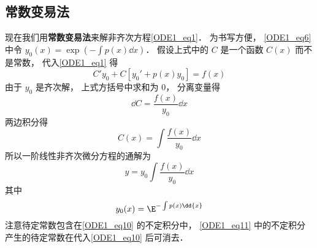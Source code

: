 \subsection{常数变易法}

现在我们用\textbf{常数变易法}来解非齐次方程\autoref{ODE1_eq1}． 为书写方便， \autoref{ODE1_eq6} 中令 $y_0(x) = \exp(-\int p(x) \dd{x})$． 假设上式中的 $C$ 是一个函数 $C(x)$ 而不是常数， 代入\autoref{ODE1_eq1} 得
\begin{equation}
C'y_0 + C[y_0' + p(x)y_0] = f(x)
\end{equation}
由于 $y_0$ 是齐次解， 上式方括号中求和为 0， 分离变量得
\begin{equation}
\dd{C}= \frac{f(x)}{y_0} \dd{x}
\end{equation}
两边积分得
\begin{equation}
C(x) = \int \frac{f(x)}{y_0} \dd{x}
\end{equation}
所以一阶线性非齐次微分方程的通解为
\begin{equation}\label{ODE1_eq10}
y = y_0  \int \frac{f(x)}{y_0} \dd{x}
\end{equation}
其中
\begin{equation}\label{ODE1_eq11}
y_0(x) = \E^{-\int p(x) \dd{x}}
\end{equation}
注意待定常数包含在\autoref{ODE1_eq10} 的不定积分中， \autoref{ODE1_eq11} 中的不定积分产生的待定常数在代入\autoref{ODE1_eq10} 后可消去．
